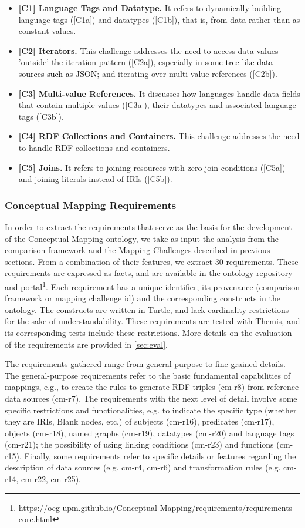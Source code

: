 \begin{itemize}
    \item \textbf{[C1] Language Tags and Datatype.} It refers to dynamically building language tags ([C1a]) and datatypes ([C1b]), that is, from data rather than as constant values.
    \item \textbf{[C2] Iterators.} This challenge addresses the need to access data values 'outside' the iteration pattern ([C2a]), especially in \textcolor{black}{some tree-like data sources such as JSON}; and iterating over multi-value references ([C2b]).
    \item \textbf{[C3] Multi-value References.} It discusses how languages  handle data fields that contain multiple values ([C3a]), their datatypes and associated language tags ([C3b]).
    \item \textbf{[C4] RDF Collections and Containers.} This challenge addresses the need to handle RDF collections and containers.
    \item \textbf{[C5] Joins.} It refers to joining resources with zero join conditions ([C5a]) and joining literals instead of IRIs ([C5b]).
\end{itemize} 


\subsubsection{Conceptual Mapping Requirements}

In order to extract the requirements that serve as the basis for the development of the Conceptual Mapping ontology, we take as input the analysis from the comparison framework and the Mapping Challenges described in previous sections. From a combination of their features, we extract 30 requirements. These requirements are expressed as facts, and are available in the ontology repository and portal\footnote{\url{https://oeg-upm.github.io/Conceptual-Mapping/requirements/requirements-core.html}}. Each requirement has a unique identifier, its provenance (comparison framework or mapping challenge id) and the corresponding constructs in the ontology. The constructs are written in Turtle, and lack cardinality restrictions for the sake of understandability. These requirements are tested with Themis, and its corresponding tests include these restrictions. More details on the evaluation of the requirements are provided in \cref{sec:eval}. 

The requirements gathered range from general-purpose to fine-grained details. The general-purpose requirements refer to the basic fundamental capabilities of mappings, e.g., to create the rules to generate RDF triples (cm-r8) from reference data sources (cm-r7). The requirements with the next level of detail involve some specific restrictions and functionalities, e.g. to indicate the specific type (whether they are IRIs, Blank nodes, etc.) of subjects (cm-r16), predicates (cm-r17), objects (cm-r18), named graphs (cm-r19), datatypes (cm-r20) and language tags (cm-r21); the possibility of using linking conditions (cm-r23) and functions (cm-r15). Finally, some requirements refer to specific details or features regarding the description of data sources (e.g. cm-r4, cm-r6) and transformation rules (e.g. cm-r14, cm-r22, cm-r25).

